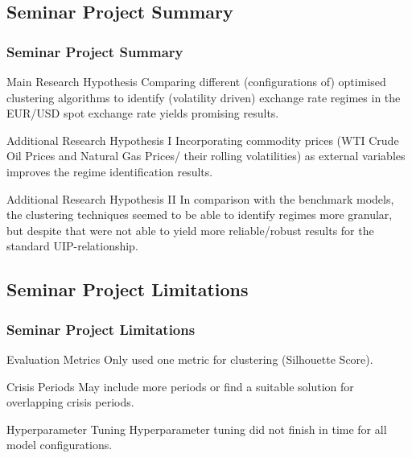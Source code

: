 \subsection{Seminar Project Summary}
\begin{frame}
	\frametitle{Seminar Project Summary}

    \begin{block}{Main Research Hypothesis}
		Comparing different (configurations of) optimised clustering algorithms to identify (volatility driven) exchange rate regimes in the EUR/USD spot exchange rate yields promising results.
	\end{block}

    \begin{block}{Additional Research Hypothesis I}
		Incorporating commodity prices (WTI Crude Oil Prices and Natural Gas Prices/ their rolling volatilities) as external variables improves the regime identification results.
	\end{block}

    \begin{block}{Additional Research Hypothesis II}
		In comparison with the benchmark models, the clustering techniques seemed to be able to identify regimes more granular, but despite that were not able to yield more reliable/robust results for the standard UIP-relationship.
	\end{block}

\end{frame}
\subsection{Seminar Project Limitations}
\begin{frame}
	\frametitle{Seminar Project Limitations}

    \begin{block}{Evaluation Metrics}
		Only used one metric for clustering (Silhouette Score).
	\end{block}

    \begin{block}{Crisis Periods}
		May include more periods or find a suitable solution for overlapping crisis periods.
	\end{block}

    \begin{block}{Hyperparameter Tuning}
		Hyperparameter tuning did not finish in time for all model configurations.
	\end{block}
\end{frame}
